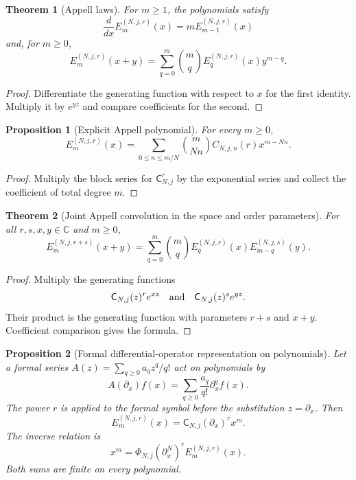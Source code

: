 \documentclass[11pt]{article}
\newtheorem{theorem}{Theorem}[section]
\newtheorem{proposition}[proposition]{Proposition}
\theoremstyle{definition}
\theoremstyle{remark}
\newcommand{\CC}{\mathbb C}
\newcommand{\Cfun}{\mathsf C}
\begin{document}
\begin{theorem}[Appell laws]\label{thm:appell_laws}
For $m\geq1$, the polynomials satisfy
\[
\frac{d}{dx}E_m^{(N,j,r)}(x)
=
mE_{m-1}^{(N,j,r)}(x)
\]
and, for $m\geq0$,
\[
E_m^{(N,j,r)}(x+y)
=
\sum_{q=0}^{m}
\binom mq
E_q^{(N,j,r)}(x)y^{m-q}.
\]
\end{theorem}

\begin{proof}
Differentiate the generating function with respect to $x$ for the first identity.  Multiply it by $e^{yz}$ and compare coefficients for the second.
\end{proof}

\begin{proposition}[Explicit Appell polynomial]\label{prop:explicit_appell}
For every $m\geq0$,
\[
E_m^{(N,j,r)}(x)
=
\sum_{0\leq n\leq m/N}
\binom{m}{Nn}
C_{N,j,n}(r)x^{m-Nn}.
\]
\end{proposition}

\begin{proof}
Multiply the block series for $\Cfun_{N,j}^r$ by the exponential series and collect the coefficient of total degree $m$.
\end{proof}


\begin{theorem}[Joint Appell convolution in the space and order parameters]\label{thm:appell_two_parameter_convolution}
For all $r,s,x,y\in\CC$ and $m\geq0$,
\[
E_m^{(N,j,r+s)}(x+y)
=
\sum_{q=0}^{m}
\binom mq
E_q^{(N,j,r)}(x)
E_{m-q}^{(N,j,s)}(y).
\]
\end{theorem}

\begin{proof}
Multiply the generating functions
\[
\Cfun_{N,j}(z)^re^{xz}
\quad\hbox{and}\quad
\Cfun_{N,j}(z)^se^{yz}.
\]
Their product is the generating function with parameters $r+s$ and $x+y$.  Coefficient comparison gives the formula.
\end{proof}

\begin{proposition}[Formal differential-operator representation on polynomials]\label{prop:appell_operator_form}
Let a formal series $A(z)=\sum_{q\geq0}a_qz^q/q!$ act on polynomials by
\[
A(\partial_x)f(x)
=
\sum_{q\geq0}\frac{a_q}{q!}\partial_x^qf(x).
\]
The power $r$ is applied to the formal symbol before the substitution $z=\partial_x$.  Then
\[
E_m^{(N,j,r)}(x)
=
\Cfun_{N,j}(\partial_x)^r x^m.
\]
The inverse relation is
\[
x^m
=
\Phi_{N,j}(\partial_x^N)^r
E_m^{(N,j,r)}(x).
\]
Both sums are finite on every polynomial.
\end{proposition}
\end{document}
